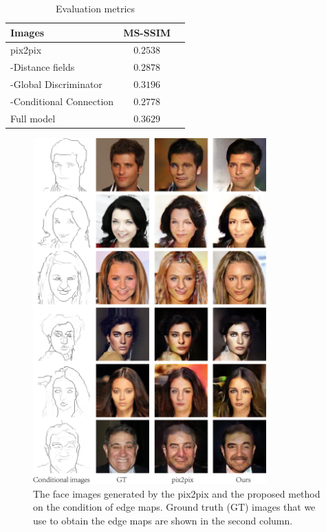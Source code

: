 %
%
\begin{table}[h]
	\centering	
	\caption{Evaluation metrics }
	\begin{tabular}{|l|c|c|}\hline
		Images & MS-SSIM \\\hline
		pix2pix & $0.2538$  \\
		-Distance fields & $0.2878$ \\
		-Global Discriminator & $0.3196$  \\
		-Conditional Connection & $0.2778$ \\
		Full model & $\mathbf{0.3629}$ \\\hline
	\end{tabular}
	\label{tab:evaluation_metrics}
\end{table}
%
%
\begin{figure}
	\includegraphics[width=0.8\textwidth]{figures/results}
	\caption{The face images generated by the pix2pix and the proposed method on the condition of edge maps. Ground truth (GT) images that we use to obtain the edge maps are shown in the second column. }
	\label{fig:results}
\end{figure}
%
%
